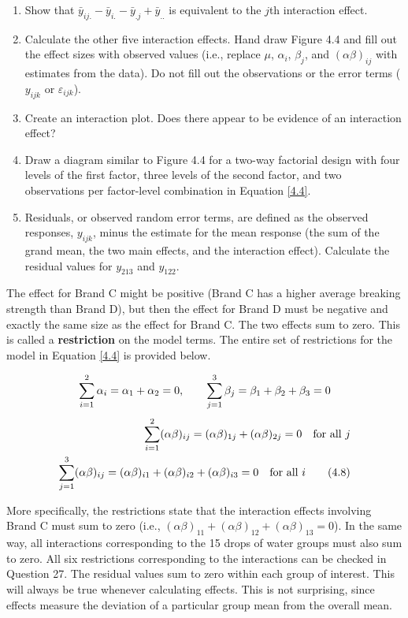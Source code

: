 \documentclass[
]{report}
\providecommand{\tightlist}{%
  \setlength{\itemsep}{0pt}\setlength{\parskip}{0pt}}
\begin{document}
\begin{enumerate}
\def\labelenumi{\arabic{enumi}.}
\setcounter{enumi}{25}
\tightlist
\item
  Show that \(\bar{y}_{ij.} - \bar{y}_{i.} - \bar{y}_{.j} + \bar{y}_{..}\) is equivalent to the \(j\)th interaction effect.
\item
  Calculate the other five interaction effects. Hand draw Figure 4.4 and fill out the effect sizes with observed values (i.e., replace \(\mu\), \(\alpha_i\), \(\beta_j\), and \((\alpha\beta)_{ij}\) with estimates from the data). Do not fill out the observations or the error terms (\(y_{ijk}\) or \(\varepsilon_{ijk}\)).
\item
  Create an interaction plot. Does there appear to be evidence of an interaction effect?
\item
  Draw a diagram similar to Figure 4.4 for a two-way factorial design with four levels of the first factor, three levels of the second factor, and two observations per factor-level combination in Equation \ref{4.4}.
\item
  Residuals, or observed random error terms, are defined as the observed responses, \(y_{ijk}\), minus the estimate for the mean response (the sum of the grand mean, the two main effects, and the interaction effect). Calculate the residual values for \(y_{213}\) and \(y_{122}\).
\end{enumerate}

The effect for Brand C might be positive (Brand C has a higher average breaking strength than Brand D), but then the effect for Brand D must be negative and exactly the same size as the effect for Brand C. The two effects sum to zero. This is called a \textbf{restriction} on the model terms. The entire set of restrictions for the model in Equation \ref{4.4} is provided below.

\begin{align}
\sum_{i=1}^{2} \alpha_i = \alpha_1 + \alpha_2 = 0, \qquad \sum_{j=1}^{3} \beta_j = \beta_1 + \beta_2 + \beta_3 = 0 \notag
\end{align}
\begin{align}
\sum_{i=1}^{2} (\alpha\beta)_{ij} = (\alpha\beta)_{1j} + (\alpha\beta)_{2j} = 0 \quad \text{for all } j \notag \\
\sum_{j=1}^{3} (\alpha\beta)_{ij} = (\alpha\beta)_{i1} + (\alpha\beta)_{i2} + (\alpha\beta)_{i3} = 0 \quad \text{for all } i \tag{4.8} \label{4.8}
\end{align}

More specifically, the restrictions state that the interaction effects involving Brand C must sum to zero (i.e., \((\alpha\beta)_{11} + (\alpha\beta)_{12} + (\alpha\beta)_{13} = 0\)). In the same way, all interactions corresponding to the 15 drops of water groups must also sum to zero. All six restrictions corresponding to the interactions can be checked in Question 27. The residual values sum to zero within each group of interest. This will always be true whenever calculating effects. This is not surprising, since effects measure the deviation of a particular group mean from the overall mean.
\end{document}
